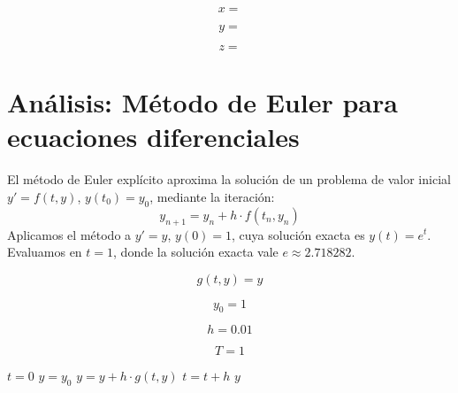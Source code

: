 \documentclass{article}
\begin{document}
\begin{equation}
    x =
    \label{eq:res:x}
\end{equation}

\begin{equation}
    y =
    \label{eq:res:y}
\end{equation}

\begin{equation}
    z =
    \label{eq:res:z}
\end{equation}


\section{Análisis: Método de Euler para ecuaciones diferenciales}

El método de Euler explícito aproxima la solución de un problema de valor inicial
$y' = f(t, y)$, $y(t_0) = y_0$, mediante la iteración:
\[
    y_{n+1} = y_n + h \cdot f(t_n, y_n)
\]
Aplicamos el método a $y' = y$, $y(0) = 1$, cuya solución exacta es $y(t) = e^t$.
Evaluamos en $t = 1$, donde la solución exacta vale $e \approx 2.718282$.

\begin{equation}
    g(t, y) = y
    \label{eq:calc:g}
\end{equation}

\begin{equation}
    y_0 = 1
    \label{eq:calc:y0}
\end{equation}

\begin{equation}
    h = 0.01
    \label{eq:calc:h}
\end{equation}

\begin{equation}
    T = 1
    \label{eq:calc:T}
\end{equation}

\begin{algorithm}
\caption{Método de Euler para $y' = y$, $y(0) = 1$}
\begin{algorithmic}
    \STATE $t = 0$
    \STATE $y = y_0$
        \STATE $y = y + h \cdot g(t, y)$
        \STATE $t = t + h$
    \ENDWHILE
    \RETURN $y$
\end{algorithmic}
\end{algorithm}
\end{document}

